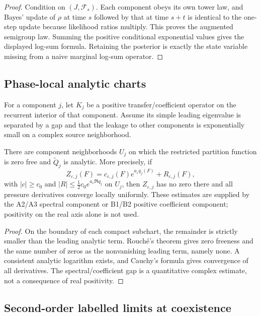\begin{proof}
Condition on $(J,\mathcal F_s)$.  Each component obeys its own tower law,
and Bayes' update of $\rho$ at time $s$ followed by that at time $s+t$ is
identical to the one-step update because likelihood ratios multiply.  This
proves the augmented semigroup law.  Summing the positive conditional
exponential values gives the displayed log-sum formula.  Retaining the
posterior is exactly the state variable missing from a naive marginal
log-sum operator.
\end{proof}

\subsection{Phase-local analytic charts}

For a component $j$, let $K_j$ be a positive transfer/coefficient operator on
the recurrent interior of that component.  Assume its simple leading
eigenvalue is separated by a gap and that the leakage to other components is
exponentially small on a complex source neighborhood.

\begin{theorem}
\label{thm:r17-d1-charts}
There are component neighborhoods $U_j$ on which the restricted partition
function is zero free and
$\widetilde Q_j$ is analytic.  More precisely, if
\[
 Z_{\varepsilon,j}(F)=
 c_{\varepsilon,j}(F)e^{a_\varepsilon q_j(F)}
 +R_{\varepsilon,j}(F),
\]
with $|c|\ge c_0$ and
$|R|\le\frac12c_0e^{a_\varepsilon\Re q_j}$ on
$U_j$, then $Z_{\varepsilon,j}$ has no zero there and all pressure
derivatives converge locally uniformly.  These estimates are supplied by the
A2/A3 spectral component or B1/B2 positive coefficient component; positivity
on the real axis alone is not used.
\end{theorem}

\begin{proof}
On the boundary of each compact subchart, the remainder is strictly smaller
than the leading analytic term.  Rouché's theorem gives zero freeness and the
same number of zeros as the nonvanishing leading term, namely none.  A
consistent analytic logarithm exists, and Cauchy's formula gives convergence
of all derivatives.  The spectral/coefficient gap is a quantitative complex
estimate, not a consequence of real positivity.
\end{proof}

\subsection{Second-order labelled limits at coexistence}

